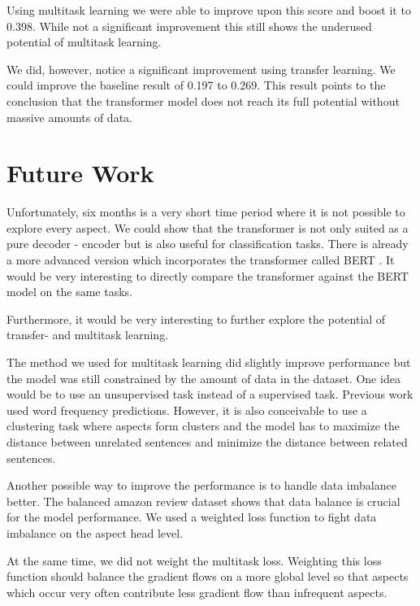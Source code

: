 Using multitask learning we were able to improve upon this score and boost it to 0.398. While not a significant improvement this still shows the underused potential of multitask learning.
\medskip

We did, however, notice a significant improvement using transfer learning. We could improve the baseline result of 0.197 to 0.269. This result points to the conclusion that the transformer model does not reach its full potential without massive amounts of data.


\section{Future Work}

Unfortunately, six months is a very short time period where it is not possible to explore every aspect. We could show that the transformer is not only suited as a pure decoder - encoder but is also useful for classification tasks. There is already a more advanced version which incorporates the transformer called BERT \cite{Devlin2018a}. It would be very interesting to directly compare the transformer against the BERT model on the same tasks.
\medskip

Furthermore, it would be very interesting to further explore the potential of transfer- and multitask learning.
\smallskip

The method we used for multitask learning did slightly improve performance but the model was still constrained by the amount of data in the dataset. One idea would be to use an unsupervised task instead of a supervised task. Previous work used word frequency predictions. However, it is also conceivable to use a clustering task where aspects form clusters and the model has to maximize the distance between unrelated sentences and minimize the distance between related sentences.
\medskip

Another possible way to improve the performance is to handle data imbalance better. The balanced amazon review dataset shows that data balance is crucial for the model performance. We used a weighted loss function to fight data imbalance on the aspect head level.
\smallskip

At the same time, we did not weight the multitask loss. Weighting this loss function should balance the gradient flows on a more global level so that aspects which occur very often contribute less gradient flow than infrequent aspects.
